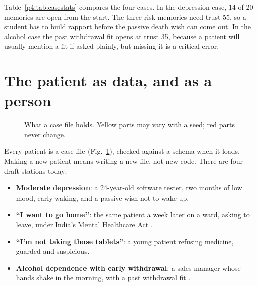 \documentclass[10pt]{article}
\begin{document}
Table~\ref{p4:tab:casestats} compares the four cases. In the depression case, 14 of 20 memories are open from the start. The three risk memories need trust 55, so a student has to build rapport before the passive death wish can come out. In the alcohol case the past withdrawal fit opens
at trust 35, because a patient will usually mention a fit if asked plainly, but missing it is a critical error.



\section{The patient as data, and as a person}\label{s:data}



\begin{figure}[htbp]
\centering
{}
\caption{What a case file holds. Yellow parts may vary with a seed; red parts never change.}
\label{p2:fig:case}
\end{figure}

Every patient is a case file (Fig.~\ref{p2:fig:case}), checked against a schema when it loads. Making a new patient means writing a new file, not new
code. There are four draft stations today:
\begin{itemize}
\item \textbf{Moderate depression}: a 24-year-old software tester, two months of low mood, early waking, and a passive wish not to wake up.
\item \textbf{``I want to go home''}: the same patient a week later on a ward, asking to leave, under India's Mental Healthcare Act \cite{mhca2017}.
\item \textbf{``I'm not taking those tablets''}: a young patient refusing medicine, guarded and suspicious.
\item \textbf{Alcohol dependence with early withdrawal}: a sales manager whose hands shake in the morning, with a past withdrawal fit
\cite{nice2010cg100}.
\end{itemize}
\end{document}
